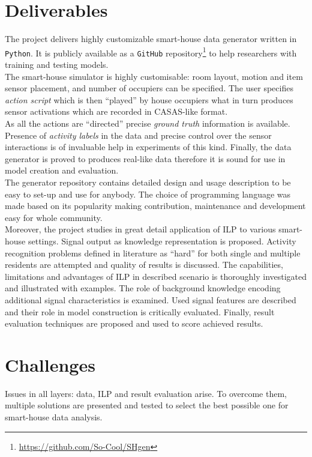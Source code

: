 \documentclass[12pt, a4paper, pdflatex, leqno, twoside, openright]{report}
\begin{document}
\section{Deliverables}
The project delivers highly customizable smart-house data generator written in \texttt{Python}. It is publicly available as a \texttt{GitHub} repository\footnote{\noindent\url{https://github.com/So-Cool/SHgen}} to help researchers with training and testing models.\\
The smart-house simulator is highly customisable: room layout, motion and item sensor placement, and number of occupiers can be specified. The user specifies \emph{action script} which is then ``played'' by house occupiers what in turn produces sensor activations which are recorded in CASAS-like format.\\
As all the actions are ``directed'' precise \emph{ground truth} information is available. Presence of \emph{activity labels} in the data and precise control over the sensor interactions is of invaluable help in experiments of this kind. Finally, the data generator is proved to produces real-like data therefore it is sound for use in model creation and evaluation.\\
The generator repository contains detailed design and usage description to be easy to set-up and use for anybody. The choice of programming language was made based on its popularity making contribution, maintenance and development easy for whole community.\\

Moreover, the project studies in great detail application of ILP to various smart-house settings. Signal output as knowledge representation is proposed. Activity recognition problems defined in literature as ``hard'' for both single and multiple residents are attempted and quality of results is discussed. The capabilities, limitations and advantages of ILP in described scenario is thoroughly investigated and illustrated with examples. The role of background knowledge encoding additional signal characteristics is examined. Used signal features are described and their role in model construction is critically evaluated. Finally, result evaluation techniques are proposed and used to score achieved results.

\section{Challenges}
Issues in all layers: data, ILP and result evaluation arise. To overcome them, multiple solutions are presented and tested to select the best possible one for smart-house data analysis.\\
\end{document}
